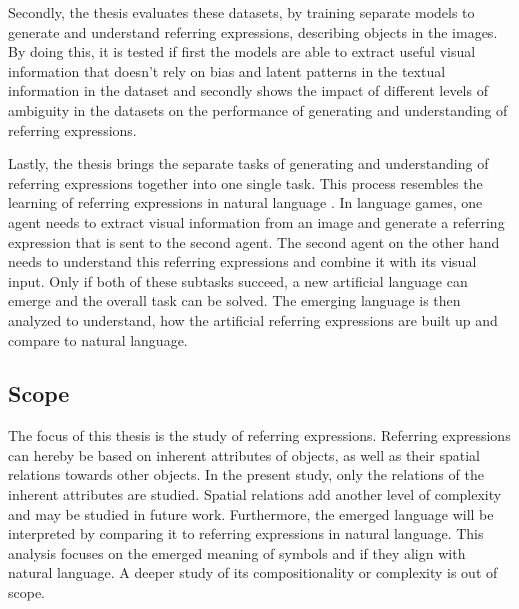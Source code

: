 Secondly, the thesis evaluates these datasets, by training separate models to generate and understand referring expressions, describing objects in the images.
By doing this, it is tested if first the models are able to extract useful visual information that doesn't rely on bias and latent patterns in the textual information in the dataset and secondly shows the impact of different levels of ambiguity in the datasets on the performance of generating and understanding of referring expressions.

Lastly, the thesis brings the separate tasks of generating and understanding of referring expressions together into one single task.
This process resembles the learning of referring expressions in natural language \citep{Clark1986}.
In language games, one agent needs to extract visual information from an image and generate a referring expression that is sent to the second agent.
The second agent on the other hand needs to understand this referring expressions and combine it with its visual input.
Only if both of these subtasks succeed, a new artificial language can emerge and the overall task can be solved.
The emerging language is then analyzed to understand, how the artificial referring expressions are built up and compare to natural language.

\subsection{Scope}
The focus of this thesis is the study of referring expressions.
Referring expressions can hereby be based on inherent attributes of objects, as well as their spatial relations towards other objects.
In the present study, only the relations of the inherent attributes are studied.
Spatial relations add another level of complexity and may be studied in future work.
Furthermore, the emerged language will be interpreted by comparing it to referring expressions in natural language.
This analysis focuses on the emerged meaning of symbols and if they align with natural language.
A deeper study of its compositionality or complexity is out of scope.
